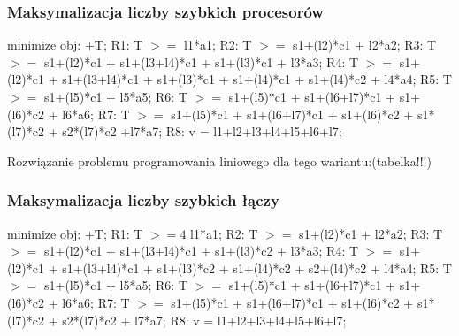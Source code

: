 \documentclass[a4paper,11pt, titlepage]{article}
\begin{document}
\subsubsection{Maksymalizacja liczby szybkich procesorów}
\begin{flushleft}

minimize obj: +T;\linebreak
\linebreak
R1: T $>=$ l1*a1;\linebreak
R2: T $>=$ s1+(l2)*c1 + l2*a2;\linebreak
R3: T $>=$ s1+(l2)*c1 + s1+(l3+l4)*c1 + s1+(l3)*c1 + l3*a3;\linebreak
R4: T $>=$ s1+(l2)*c1 + s1+(l3+l4)*c1 + s1+(l3)*c1 + s1+(l4)*c1 + s1+(l4)*c2 + l4*a4;\linebreak
R5: T $>=$ s1+(l5)*c1 + l5*a5;\linebreak
R6: T $>=$ s1+(l5)*c1 + s1+(l6+l7)*c1 + s1+(l6)*c2 + l6*a6;\linebreak
R7: T $>=$ s1+(l5)*c1 + s1+(l6+l7)*c1 + s1+(l6)*c2 + s1*(l7)*c2 + s2*(l7)*c2 +l7*a7;\linebreak
R8: v = l1+l2+l3+l4+l5+l6+l7;\linebreak
\end{flushleft}

Rozwiązanie problemu programowania liniowego dla tego wariantu:(tabelka!!!)

\subsubsection{Maksymalizacja liczby szybkich łączy}
\begin{flushleft}

minimize obj: +T;\linebreak
\linebreak
R1: T $>=4$ l1*a1;\linebreak
R2: T $>=$ s1+(l2)*c1 + l2*a2;\linebreak
R3: T $>=$ s1+(l2)*c1 + s1+(l3+l4)*c1 + s1+(l3)*c2 + l3*a3;\linebreak
R4: T $>=$ s1+(l2)*c1 + s1+(l3+l4)*c1 + s1+(l3)*c2 + s1+(l4)*c2 + s2+(l4)*c2 + l4*a4;\linebreak
R5: T $>=$ s1+(l5)*c1 + l5*a5;\linebreak
R6: T $>=$ s1+(l5)*c1 + s1+(l6+l7)*c1 + s1+(l6)*c2 + l6*a6;\linebreak
R7: T $>=$ s1+(l5)*c1 + s1+(l6+l7)*c1 + s1+(l6)*c2 + s1*(l7)*c2 + s2*(l7)*c2 + l7*a7;\linebreak
R8: v = l1+l2+l3+l4+l5+l6+l7;\linebreak
\end{flushleft}
\end{document}
